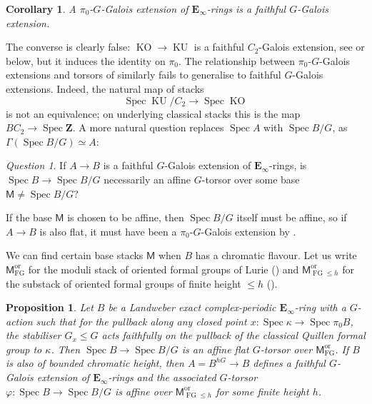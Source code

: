 \documentclass[11pt, a4paper]{article}
\newcommand{\ori}{\mathrm{or}}
\DeclareMathOperator{\Spec}{Spec}
\newcommand{\1}{\mathbf{1}}
\DeclareMathOperator{\KU}{KU}
\DeclareMathOperator{\KO}{KO}
\DeclareMathOperator{\FG}{FG}
\newcommand{\E}{\mathbf{E}}
\newcommand{\M}{\mathsf{M}}
\newcommand{\Z}{\mathbf{Z}}
\newcommand{\Ga}{\Gamma}
\theoremstyle{plain}
\newtheorem{prop}[equation]{Proposition}
\newtheorem{cor}[equation]{Corollary}
\theoremstyle{definition}
\theoremstyle{remark}\numberwithin{equation}{section}
\newtheorem{question}[equation]{Question}
\begin{document}
\begin{cor}
    A $\pi_0$-$G$-Galois extension of $\E_\infty$-rings is a faithful $G$-Galois extension.
\end{cor}

The converse is clearly false: $\KO \to \KU$ is a faithful $C_2$-Galois extension, see \cite[Pr.5.3.1]{johnrognessdualisinggorups} or  below, but it induces the identity on $\pi_0$. The relationship between $\pi_0$-$G$-Galois extensions and torsors of  similarly fails to generalise to faithful $G$-Galois extensions. Indeed, the natural map of stacks
\[\Spec \KU / C_2 \to \Spec \KO\]
is not an equivalence; on underlying classical stacks this is the map $BC_2 \to \Spec \Z$. A more natural question replaces $\Spec A$ with $\Spec B / G$, as $\Ga(\Spec B/G) \simeq A$:

\begin{question}\label{q:Ggalois}
    If $A \to B$ is a faithful $G$-Galois extension of $\E_\infty$-rings, is $\Spec B \to \Spec B / G$ necessarily an affine $G$-torsor over some base $\M\neq \Spec B / G$?
\end{question}

If the base $\M$ is chosen to be affine, then $\Spec B/G$ itself must be affine, so if $A\to B$ is also flat, it must have been a $\pi_0$-$G$-Galois extension by .

We can find certain base stacks $\M$ when $B$ has a chromatic flavour. Let us write $\M_{\FG}^\ori$ for the moduli stack of oriented formal groups of Lurie (\cite[Df.4.1.1.2]{reconstruction}) and $\M_{\FG\leq h}^\ori$ for the substack of oriented formal groups of finite height $\leq h$ (\cite[Df.4.3.1.2]{reconstruction}).

\begin{prop}\label{pr:chromatic_positive_answer}
    Let $B$ be a Landweber exact complex-periodic $\E_\infty$-ring with a $G$-action such that for the pullback along any closed point $x\colon \Spec \kappa \to \Spec \pi_0 B$, the stabiliser $G_x \leq G$ acts faithfully on the pullback of the classical Quillen formal group to $\kappa$. Then $\Spec B \to \Spec B/G$ is an affine flat $G$-torsor over $\M_{\FG}^\ori$. If $B$ is also of bounded chromatic height, then $A=B^{hG} \to B$ defines a faithful $G$-Galois extension of $\E_\infty$-rings and the associated $G$-torsor $\varphi\colon \Spec B \to \Spec B/G$ is affine over $\M_{\FG\leq h}^\ori$ for some finite height $h$.
\end{prop}
\end{document}
